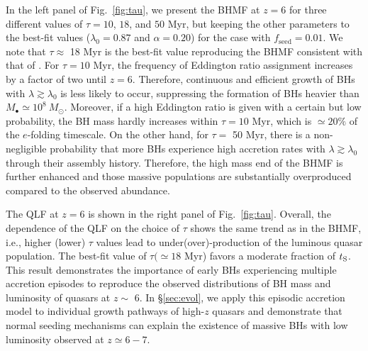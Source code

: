 \documentclass[twocolumn, twocolappendix]{aastex63}
\newcommand{\Msun}{M_\odot}
\newcommand{\tlife}{\tau}
\newcommand{\fseed}{f_\mathrm{seed}}
\begin{document}
\begin{CJK*}{UTF8}{gbsn}
In the left panel of Fig.~\ref{fig:tau}, we present the BHMF at $z=6$ for three different values of $\tlife=10$, $18$, and $50$ Myr,
but keeping the other parameters to the best-fit values ($\lambda_0=0.87$ and $\alpha=0.20$) for the case with $\fseed=0.01$.
We note that $\tlife \approx$ 18 Myr is the best-fit value reproducing the BHMF consistent with that of .
For $\tlife=10$ Myr, the frequency of Eddington ratio assignment increases by a factor of two until $z=6$.
Therefore, continuous and efficient growth of BHs with $\lambda \gtrsim \lambda_0$ is less likely to occur,
suppressing the formation of BHs heavier than $M_\bullet \simeq 10^8~\Msun$.
Moreover, if a high Eddington ratio is given with a certain but low probability, the BH mass hardly increases
within $\tlife=10$ Myr, which is $\simeq 20\%$ of the $e$-folding timescale.
On the other hand, for $\tlife=$ 50 Myr, there is a non-negligible probability that
more BHs experience high accretion rates with $\lambda\gtrsim \lambda_0$ through their assembly history.
Therefore, the high mass end of the BHMF is further enhanced and those massive populations are substantially
overproduced compared to the observed abundance.

The QLF at $z=6$ is shown in the right panel of Fig.~\ref{fig:tau}.
Overall, the dependence of the QLF on the choice of $\tau$ shows the same trend as in the BHMF,
i.e., higher (lower) $\tlife$ values lead to under(over)-production of the luminous quasar population.
The best-fit value of $\tlife (\simeq 18$ Myr) favors a moderate fraction of $t_{\rm S}$.
This result demonstrates the importance of early BHs experiencing multiple accretion episodes to 
reproduce the observed distributions of BH mass and luminosity of quasars at $z\sim$ 6.
In \S\ref{sec:evol}, we apply this episodic accretion model to individual growth pathways of high-$z$ quasars
and demonstrate that normal seeding mechanisms can explain the existence of massive BHs with low luminosity
observed at $z\simeq 6-7$.


\end{CJK*}
\end{document}
